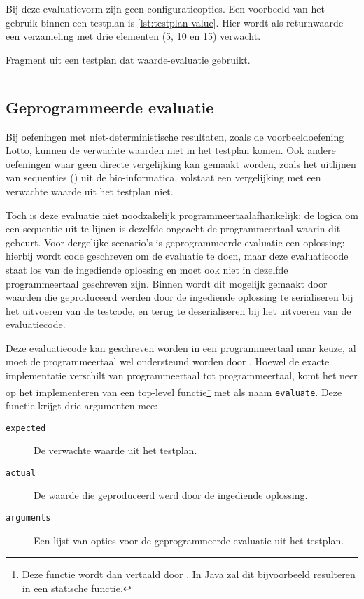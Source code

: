 Bij deze evaluatievorm zijn geen configuratieopties.
Een voorbeeld van het gebruik binnen een testplan is \cref{lst:testplan-value}.
Hier wordt als returnwaarde een verzameling met drie elementen (5, 10 en 15) verwacht.

\begin{listing}[h]
    \caption{Fragment uit een testplan dat waarde-evaluatie gebruikt.}
    \label{lst:testplan-value}
    \inputminted{json}{code/testplan-value.json}
\end{listing}

\subsection{Geprogrammeerde evaluatie}\label{subsec:geprogrammeerde-evaluatie}

Bij oefeningen met niet-deterministische resultaten, zoals de voorbeeldoefening Lotto, kunnen de verwachte waarden niet in het testplan komen.
Ook andere oefeningen waar geen directe vergelijking kan gemaakt worden, zoals het uitlijnen van sequenties () uit de bio-informatica, volstaat een vergelijking met een verwachte waarde uit het testplan niet.

Toch is deze evaluatie niet noodzakelijk programmeertaalafhankelijk: de logica om een sequentie uit te lijnen is dezelfde ongeacht de programmeertaal waarin dit gebeurt.
Voor dergelijke scenario's is geprogrammeerde evaluatie een oplossing: hierbij wordt code geschreven om de evaluatie te doen, maar deze evaluatiecode staat los van de ingediende oplossing en moet ook niet in dezelfde programmeertaal geschreven zijn.
Binnen \tested{} wordt dit mogelijk gemaakt door waarden die geproduceerd werden door de ingediende oplossing te serialiseren bij het uitvoeren van de testcode, en terug te deserialiseren bij het uitvoeren van de evaluatiecode.

Deze evaluatiecode kan geschreven worden in een programmeertaal naar keuze, al moet de programmeertaal wel ondersteund worden door \tested{}.
Hoewel de exacte implementatie verschilt van programmeertaal tot programmeertaal, komt het neer op het implementeren van een top-level functie\footnote{
    Deze functie wordt dan vertaald door \tested{}.
    In Java zal dit bijvoorbeeld resulteren in een statische functie.
} met als naam \texttt{evaluate}.
Deze functie krijgt drie argumenten mee:

\begin{description}
    \item[\texttt{expected}] De verwachte waarde uit het testplan.
    \item[\texttt{actual}] De waarde die geproduceerd werd door de ingediende oplossing.
    \item[\texttt{arguments}] Een lijst van opties voor de geprogrammeerde evaluatie uit het testplan.
\end{description}

